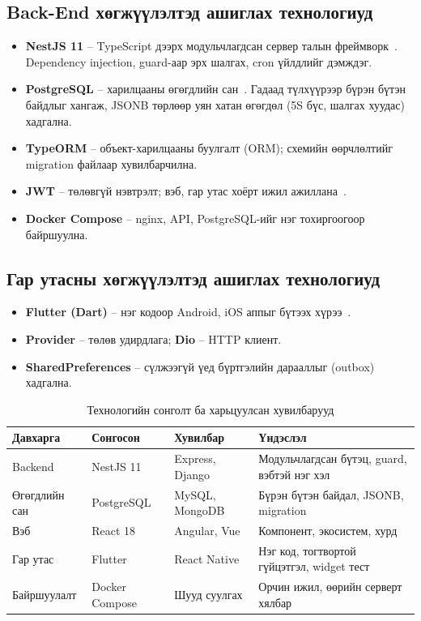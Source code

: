 \subsection{Back-End хөгжүүлэлтэд ашиглах технологиуд}
\begin{itemize}
    \item \textbf{NestJS 11} -- TypeScript дээрх модульчлагдсан сервер талын фреймворк~\cite{nestjs}. Dependency injection, guard-аар эрх шалгах, cron үйлдлийг дэмждэг.
    \item \textbf{PostgreSQL} -- харилцааны өгөгдлийн сан~\cite{postgres}. Гадаад түлхүүрээр бүрэн бүтэн байдлыг хангаж, JSONB төрлөөр уян хатан өгөгдөл (5S бүс, шалгах хуудас) хадгална.
    \item \textbf{TypeORM} -- объект-харилцааны буулгалт (ORM); схемийн өөрчлөлтийг migration файлаар хувилбарчилна.
    \item \textbf{JWT} -- төлөвгүй нэвтрэлт; вэб, гар утас хоёрт ижил ажиллана~\cite{jwt}.
    \item \textbf{Docker Compose} -- nginx, API, PostgreSQL-ийг нэг тохиргоогоор байршуулна.
\end{itemize}

\subsection{Гар утасны хөгжүүлэлтэд ашиглах технологиуд}
\begin{itemize}
    \item \textbf{Flutter (Dart)} -- нэг кодоор Android, iOS аппыг бүтээх хүрээ~\cite{flutter}.
    \item \textbf{Provider} -- төлөв удирдлага; \textbf{Dio} -- HTTP клиент.
    \item \textbf{SharedPreferences} -- сүлжээгүй үед бүртгэлийн дарааллыг (outbox) хадгална.
\end{itemize}

\begin{table}[H]
\centering
\caption{Технологийн сонголт ба харьцуулсан хувилбарууд}
\label{table:tech}
\begin{tabular}{|p{2.7cm}|p{3.2cm}|p{2.8cm}|p{4.9cm}|}
\hline
\textbf{Давхарга} & \textbf{Сонгосон} & \textbf{Хувилбар} & \textbf{Үндэслэл} \\ \hline
Backend & NestJS 11 & Express, Django & Модульчлагдсан бүтэц, guard, вэбтэй нэг хэл \\ \hline
Өгөгдлийн сан & PostgreSQL & MySQL, MongoDB & Бүрэн бүтэн байдал, JSONB, migration \\ \hline
Вэб & React 18 & Angular, Vue & Компонент, экосистем, хурд \\ \hline
Гар утас & Flutter & React Native & Нэг код, тогтвортой гүйцэтгэл, widget тест \\ \hline
Байршуулалт & Docker Compose & Шууд суулгах & Орчин ижил, өөрийн серверт хялбар \\ \hline
\end{tabular}
\end{table}

